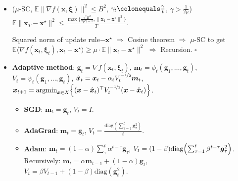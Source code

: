 \documentclass[8pt,a4paper]{extarticle}
\renewcommand{\proof}[1]{\begin{tcolorbox}#1 \hfill $\square$\end{tcolorbox}}
\DeclareMathOperator*{\argmin}{argmin}
\newcommand{\lft}{\mathopen{}\mathclose\bgroup\left}
\newcommand{\rgt}{\aftergroup\egroup\right}
\newcommand{\E}{\mathbb{E}}
\renewcommand{\vec}[1]{\bm{#1}}
\newcommand{\mat}[1]{#1}
\newenvironment{topic}[1]
{\textbf{\sffamily \colorbox{black}{\rlap{\textbf{\textcolor{white}{#1}}}\hspace{\linewidth}\hspace{-2\fboxsep}}} \\ \vspace{0.2cm}}
{}
\begin{document}
\begin{multicols*}{2}
\begin{topic}{Stochastic optimization}
\begin{itemize}
            \item ($\mu$-SC, $\E \| \nabla f(\vec{x}, \vec{\xi}) \|^2 \leq B^2$, $\gamma_t \colonequals \frac{\gamma}{t}$, $\gamma > \frac{1}{2 \mu}$)\\
                  $\E \| \vec{x}_T - \vec{x}^\star \|^2 \leq \frac{\max \{ \frac{\gamma^2 B^2}{2 \mu \gamma - 1}, \| \vec{x}_1 - \vec{x}^\star \|^2 \}}{T}$.
                  \proof{Squared norm of update rule$-\vec{x}^\star$ $\Rightarrow$ Cosine theorem $\Rightarrow$ $\mu$-SC to get $\E\langle \nabla f(\vec{x}_t, \vec{\xi}_t), \vec{x}_t - \vec{x}^\star \rangle \geq \mu \cdot \E \| \vec{x}_t - \vec{x}^\star \|^2$ $\Rightarrow$ Recursion.}
            \item \textbf{Adaptive method}: $\vec{g}_t = \nabla f(\vec{x}_t, \vec{\xi}_t)$, $\vec{m}_t = \phi_t(\vec{g}_1, \ldots, \vec{g}_t)$, $\mat{V}_t = \psi_t(\vec{g}_1, \ldots, \vec{g}_t)$, $\hat{\vec{x}}_t = \vec{x}_t - \alpha_t \mat{V}_t^{-\nicefrac{1}{2}} \vec{m}_t$, $\vec{x}_{t+1} = \argmin_{\vec{x} \in X} \lft\{ (\vec{x} - \hat{\vec{x}}_t)^\top \mat{V}_t^{-\nicefrac{1}{2}}(\vec{x} - \hat{\vec{x}}_t) \rgt\}$.
                  \begin{itemize}
                      \item \textbf{SGD}: $\vec{m}_t = \vec{g}_t$, $\mat{V}_t = \mat{I}$.
                      \item \textbf{AdaGrad}: $\vec{m}_t = \vec{g}_t$, $\mat{V}_t = \frac{\mathrm{diag}(\sum_{\tau=1}^{t} \vec{g}_{\tau}^2)}{t}$.
                      \item \textbf{Adam}: $\vec{m}_t = (1-\alpha) \sum_{\tau}^{t} \alpha^{t-\tau} \vec{g}_{\tau}$, $\mat{V}_t = (1-\beta) \mathrm{diag} \lft( \sum_{\tau=1}^{t} \beta^{t-\tau} \vec{g}_{\tau}^2 \rgt)$.
                            Recursively: $\vec{m}_t = \alpha \vec{m}_{t-1} + (1-\alpha) \vec{g}_t$, $\mat{V}_t = \beta \mat{V}_{t-1} + (1-\beta)\mathrm{diag}(\vec{g}_t^2)$.
                  \end{itemize}
        \end{itemize}
    \end{topic}


\end{multicols*}
\end{document}
